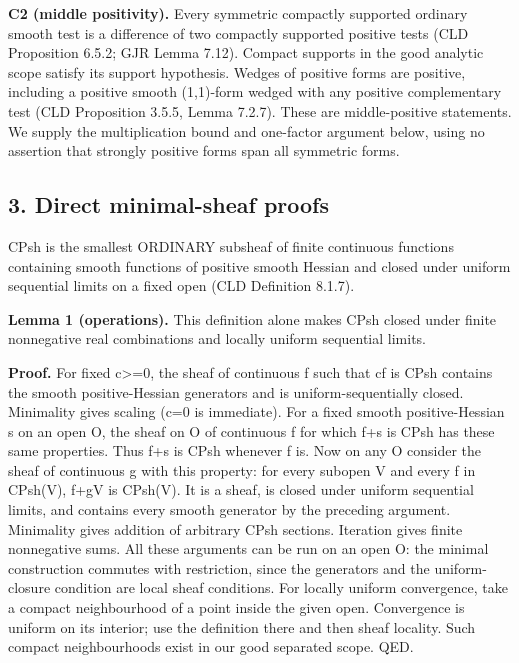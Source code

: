 \documentclass[
  11pt,
]{article}
\begin{document}
\textbf{C2 (middle positivity).} Every symmetric compactly supported
ordinary smooth test is a difference of two compactly supported positive
tests (CLD Proposition 6.5.2; GJR Lemma 7.12). Compact supports in the
good analytic scope satisfy its support hypothesis. Wedges of positive
forms are positive, including a positive smooth (1,1)-form wedged with
any positive complementary test (CLD Proposition 3.5.5, Lemma 7.2.7).
These are middle-positive statements. We supply the multiplication bound
and one-factor argument below, using no assertion that strongly positive
forms span all symmetric forms.

\subsection{3. Direct minimal-sheaf
proofs}\label{direct-minimal-sheaf-proofs}

CPsh is the smallest ORDINARY subsheaf of finite continuous functions
containing smooth functions of positive smooth Hessian and closed under
uniform sequential limits on a fixed open (CLD Definition 8.1.7).

\textbf{Lemma 1 (operations).} This definition alone makes CPsh closed
under finite nonnegative real combinations and locally uniform
sequential limits.

\textbf{Proof.} For fixed c\textgreater=0, the sheaf of continuous f
such that cf is CPsh contains the smooth positive-Hessian generators and
is uniform-sequentially closed. Minimality gives scaling (c=0 is
immediate). For a fixed smooth positive-Hessian s on an open O, the
sheaf on O of continuous f for which f+s is CPsh has these same
properties. Thus f+s is CPsh whenever f is. Now on any O consider the
sheaf of continuous g with this property: for every subopen V and every
f in CPsh(V), f+g\textbar V is CPsh(V). It is a sheaf, is closed under
uniform sequential limits, and contains every smooth generator by the
preceding argument. Minimality gives addition of arbitrary CPsh
sections. Iteration gives finite nonnegative sums. All these arguments
can be run on an open O: the minimal construction commutes with
restriction, since the generators and the uniform-closure condition are
local sheaf conditions. For locally uniform convergence, take a compact
neighbourhood of a point inside the given open. Convergence is uniform
on its interior; use the definition there and then sheaf locality. Such
compact neighbourhoods exist in our good separated scope. QED.
\end{document}
